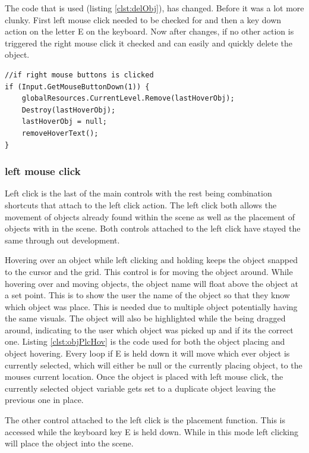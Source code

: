 The code that is used (listing \ref{clst:delObj}), has changed. Before it was a lot more clunky. First left mouse click needed to be checked for and then a key down action on the letter E on the keyboard. Now after changes, if no other action is triggered the right mouse click it checked and can easily and quickly delete the object.

\begin{minipage}{\textwidth}
\begin{lstlisting}[language={[Sharp]C}, caption=delete Object with right click, label=clst:delObj]
//if right mouse buttons is clicked
if (Input.GetMouseButtonDown(1)) {
	globalResources.CurrentLevel.Remove(lastHoverObj);
	Destroy(lastHoverObj);
	lastHoverObj = null;
	removeHoverText();
}
\end{lstlisting}
\end{minipage}

\subsubsection{left mouse click}
Left click is the last of the main controls with the rest being combination shortcuts that attach to the left click action. The left click both allows the movement of objects already found within the scene as well as the placement of objects with in the scene. Both controls attached to the left click have stayed the same through out development. 

Hovering over an object while left clicking and holding keeps the object snapped to the cursor and the grid. This control is for moving the object around. While hovering over and moving objects, the object name will float above the object at a set point. This is to show the user the name of the object so that they know which object was place. This is needed due to multiple object potentially having the same visuals. The object will also be highlighted while the being dragged around, indicating to the user which object was picked up and if its the correct one. Listing \ref{clst:objPlcHov} is the code used for both the object placing and object hovering. Every loop if E is held down it will move which ever object is currently selected, which will either be null or the currently placing object, to the mouses current location. Once the object is placed with left mouse click, the currently selected object variable gets set to a duplicate object leaving the previous one in place.

The other control attached to the left click is the placement function. This is accessed while the keyboard key E is held down. While in this mode left clicking will place the object into the scene.

